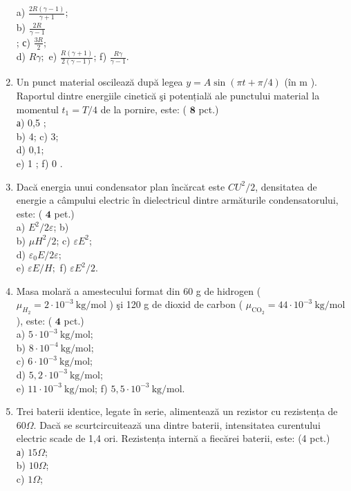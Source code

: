 \begin{enumerate}
a) $\frac{2 R(\gamma-1)}{\gamma+1}$;\\
b) $\frac{2 R}{\gamma-1}$\\
; с) $\frac{3 R}{2}$;\\
d) $R \gamma ;$ e) $\frac{R(\gamma+1)}{2(\gamma-1)}$; f) $\frac{R \gamma}{\gamma-1}$.
  \item Un punct material oscilează după legea $y=A \sin (\pi t+\pi / 4)$ (în m ). Raportul dintre energiile cinetică şi potențială ale punctului material la momentul $t_{1}=T / 4$ de la pornire, este: ( $\mathbf{8}$ pct.)\\
а) 0,5 ;\\
b) 4; c) 3;\\
d) 0,1;\\
e) 1 ; f) 0 .
  \item Dacă energia unui condensator plan încărcat este $C U^{2} / 2$, densitatea de energie a câmpului electric în dielectricul dintre armăturile condensatorului, este: ( $\mathbf{4}$ pet.)\\
a) $E^{2} / 2 \varepsilon$; b)\\
b) $\mu H^{2} / 2$; c) $\varepsilon E^{2}$;\\
d) $\varepsilon_{0} E / 2 \varepsilon$;\\
e) $\varepsilon E / H ;$ f) $\varepsilon E^{2} / 2$.
  \item Masa molară a amestecului format din 60 g de hidrogen ( $\mu_{H_{2}}=2 \cdot 10^{-3} \mathrm{~kg} / \mathrm{mol}$ ) şi 120 g de dioxid de carbon ( $\mu_{\mathrm{CO}_{2}}=44 \cdot 10^{-3} \mathrm{~kg} / \mathrm{mol}$ ), este: ( $\mathbf{4}$ pct.)\\
a) $5 \cdot 10^{-3} \mathrm{~kg} / \mathrm{mol}$;\\
b) $8 \cdot 10^{-4} \mathrm{~kg} / \mathrm{mol}$;\\
c) $6 \cdot 10^{-3} \mathrm{~kg} / \mathrm{mol}$;\\
d) $5,2 \cdot 10^{-3} \mathrm{~kg} / \mathrm{mol}$;\\
e) $11 \cdot 10^{-3} \mathrm{~kg} / \mathrm{mol}$; f) $5,5 \cdot 10^{-3} \mathrm{~kg} / \mathrm{mol}$.
  \item Trei baterii identice, legate în serie, alimentează un rezistor cu rezistența de $60 \Omega$. Dacă se scurtcircuitează una dintre baterii, intensitatea curentului electric scade de 1,4 ori. Rezistența internă a fiecărei baterii, este: (4 pct.)\\
а) $15 \Omega$;\\
b) $10 \Omega$;\\
c) $1 \Omega$;\\

\end{enumerate}
